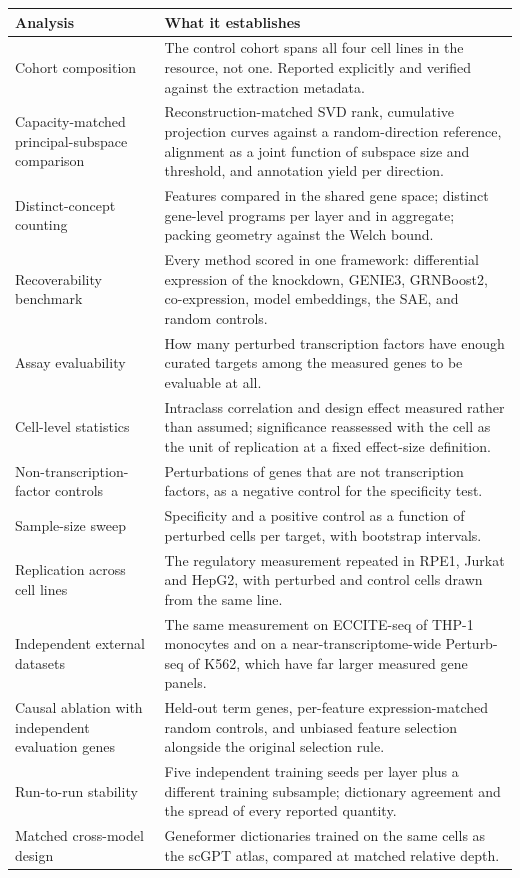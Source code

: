 \documentclass[11pt]{article}
\begin{document}
\begin{center}
\begin{tabular}{p{4.4cm}p{10.4cm}}
\hline
\textbf{Analysis} & \textbf{What it establishes} \\
\hline
Cohort composition &
The control cohort spans all four cell lines in the resource, not one. Reported explicitly and
verified against the extraction metadata. \\
Capacity-matched principal-subspace comparison &
Reconstruction-matched SVD rank, cumulative projection curves against a random-direction
reference, alignment as a joint function of subspace size and threshold, and annotation yield per
direction. \\
Distinct-concept counting &
Features compared in the shared gene space; distinct gene-level programs per layer and in
aggregate; packing geometry against the Welch bound. \\
Recoverability benchmark &
Every method scored in one framework: differential expression of the knockdown, GENIE3, GRNBoost2,
co-expression, model embeddings, the SAE, and random controls. \\
Assay evaluability &
How many perturbed transcription factors have enough curated targets among the measured genes to
be evaluable at all. \\
Cell-level statistics &
Intraclass correlation and design effect measured rather than assumed; significance reassessed
with the cell as the unit of replication at a fixed effect-size definition. \\
Non-transcription-factor controls &
Perturbations of genes that are not transcription factors, as a negative control for the
specificity test. \\
Sample-size sweep &
Specificity and a positive control as a function of perturbed cells per target, with bootstrap
intervals. \\
Replication across cell lines &
The regulatory measurement repeated in RPE1, Jurkat and HepG2, with perturbed and control cells
drawn from the same line. \\
Independent external datasets &
The same measurement on ECCITE-seq of THP-1 monocytes and on a near-transcriptome-wide Perturb-seq
of K562, which have far larger measured gene panels. \\
Causal ablation with independent evaluation genes &
Held-out term genes, per-feature expression-matched random controls, and unbiased feature
selection alongside the original selection rule. \\
Run-to-run stability &
Five independent training seeds per layer plus a different training subsample; dictionary
agreement and the spread of every reported quantity. \\
Matched cross-model design &
Geneformer dictionaries trained on the same cells as the scGPT atlas, compared at matched relative
depth. \\
\hline
\end{tabular}
\end{center}
\end{document}
